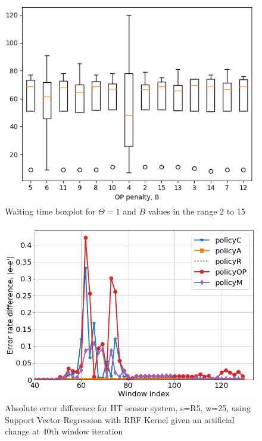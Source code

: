 \documentclass{mpaper}
\begin{document}
\begin{figure}[h]
    \centering
    \includegraphics[scale=0.4]{imgs/boxplot_svr_waiting_R5.png}
    \caption{Waiting time boxplot for $\Theta=1$ and $B$ values in the range 2 to 15}
    \label{fig:boxplot_svr}
\end{figure}

\begin{figure}[h]
    \centering
    \includegraphics[scale=0.33]{imgs/svr_rbf_R5_w25.png}
    \caption{Absolute error difference for HT sensor system, s=R5, w=25,
    using Support Vector Regression with RBF Kernel 
    given an artificial change at 40th window iteration}
    \label{fig:err_rbf_svr_R5}
\end{figure}
\end{document}
